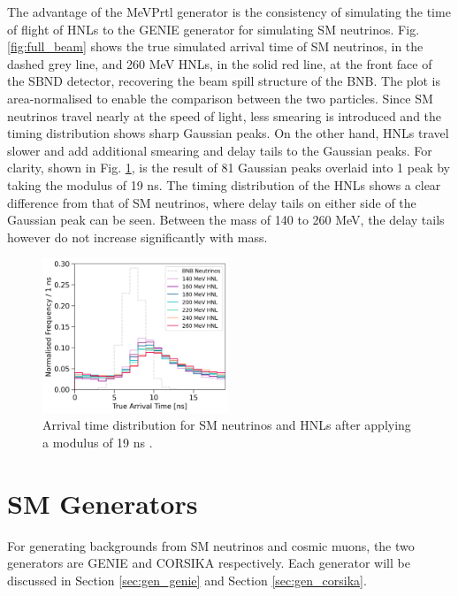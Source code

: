 The advantage of the MeVPrtl generator is the consistency of simulating the time of flight of HNLs to the GENIE generator for simulating SM neutrinos.
Fig. \ref{fig:full_beam} shows the true simulated arrival time of SM neutrinos, in the dashed grey line, and 260 MeV HNLs, in the solid red line, at the front face of the SBND detector, recovering the beam spill structure of the BNB.
The plot is area-normalised to enable the comparison between the two particles. 
Since SM neutrinos travel nearly at the speed of light, less smearing is introduced and the timing distribution shows sharp Gaussian peaks.
On the other hand, HNLs travel slower and add additional smearing and delay tails to the Gaussian peaks.
For clarity, shown in Fig. \ref{fig:beam_modulus}, is the result of 81 Gaussian peaks overlaid into 1 peak by taking the modulus of 19 ns.
The timing distribution of the HNLs shows a clear difference from that of SM neutrinos, where delay tails on either side of the Gaussian peak can be seen.
Between the mass of 140 to 260 MeV, the delay tails however do not increase significantly with mass.
\begin{figure}[ht!] 
\vspace{0.5cm}
\centering    
\includegraphics[width=0.495\textwidth]{beam_modulus}
\caption[Modulus of the Arrival Time Distibutions of SM Neutrinos and HNLs]{
Arrival time distribution for SM neutrinos and HNLs after applying a modulus of 19 ns . 
}
\label{fig:beam_modulus}
\end{figure}

\newpage
\section{SM Generators}
\label{sec:gen_sm}

For generating backgrounds from SM neutrinos and cosmic muons, the two generators are GENIE \cite{genie} and CORSIKA \cite{corsika} respectively.
Each generator will be discussed in Section \ref{sec:gen_genie} and Section \ref{sec:gen_corsika}.

